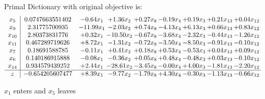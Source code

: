 \documentclass[8pt]{article}
\begin{document}
Primal Dictionary with original objective is:
\[\begin{array}{c| c c@{\hskip 2pt} c@{\hskip 2pt} c@{\hskip 2pt} c@{\hskip 2pt} c@{\hskip 2pt} c@{\hskip 2pt} c@{\hskip 2pt} }
 x_{5}   &  0.0747663551402 & -0.64 x_{1} & +  1.36 x_{2} & +  0.27 x_{8} & -0.19 x_{4} & +  0.19 x_{3} & +  0.21 x_{13} & +  0.04 x_{12}\\
 x_{9}   &  2.31775700935 & -11.99 x_{1} & -2.03 x_{2} & +  0.74 x_{8} & -4.13 x_{4} & +  6.13 x_{3} & +  0.66 x_{13} & +  0.83 x_{12}\\
 x_{10}   &  2.80373831776 & +  0.32 x_{1} & -10.50 x_{2} & -0.67 x_{8} & -3.68 x_{4} & -2.32 x_{3} & -0.44 x_{13} & -1.26 x_{12}\\
 x_{11}   &  0.467289719626 & +  8.72 x_{1} & -1.31 x_{2} & -0.72 x_{8} & -3.50 x_{4} & -8.50 x_{3} & -0.91 x_{13} & -0.10 x_{12}\\
 x_{7}   &  0.18691588785 & -0.11 x_{1} & +  0.41 x_{2} & +  0.18 x_{8} & +  0.53 x_{4} & -0.53 x_{3} & +  0.04 x_{13} & +  0.09 x_{12}\\
 x_{6}   &  0.140186915888 & -0.08 x_{1} & -0.36 x_{2} & +  0.05 x_{8} & +  0.48 x_{4} & -0.48 x_{3} & +  0.03 x_{13} & -0.10 x_{12}\\
 x_{14}   &  0.934579439252 & +  2.44 x_{1} & -28.61 x_{2} & -3.45 x_{8} & -0.00 x_{4} & +  4.00 x_{3} & -1.81 x_{13} & -2.20 x_{12}\\
\hline
z    &  -0.654205607477 & +  8.39 x_{1} & -9.77 x_{2} & -1.79 x_{8} & +  4.30 x_{4} & -0.30 x_{3} & -1.13 x_{13} & -0.66 x_{12}\\
\end{array}\]


 $ x_{1} $ enters and $ x_{5} $ leaves 
\end{document}
